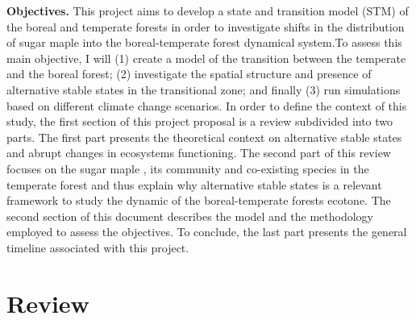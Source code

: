 \textbf{Objectives.} This project aims to develop a state and transition model
(STM) of the boreal and temperate forests in order to investigate shifts in the
distribution of sugar maple into the boreal-temperate forest dynamical
system.To assess this main objective, I will (1) create a  model of the
transition between the temperate and the boreal forest; (2) investigate the
spatial structure and presence of alternative stable states in the transitional
zone; and finally (3) run simulations based on different climate change
scenarios.  In order to define the context of this study, the first section of
this project proposal is a review subdivided into two parts. The first part
presents the theoretical context on alternative stable states and abrupt changes
in ecosystems functioning. The second part of this review focuses on the sugar
maple , its community and co-existing species in the temperate forest and thus
explain why alternative stable states is a relevant framework to study the
dynamic of the boreal-temperate forests ecotone.  The second section of this
document describes the model and the methodology employed to assess the
objectives. To conclude, the last part presents the general timeline associated
with this project.


\section{Review} 

